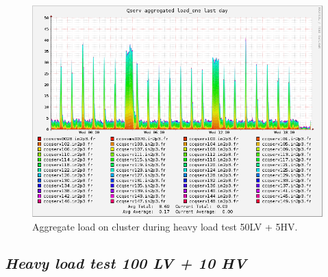 \documentclass[DM,toc]{lsstdoc}
\begin{document}
\begin{figure}
\includegraphics[width=\textwidth]{in2p3_5HV50LV}
\caption{Aggregate load on cluster during heavy load test 50LV + 5HV.}
\label{fig:aggload5}
\end{figure}

\subsection{\texorpdfstring{\textbf{\emph{Heavy load test 100 LV + 10
HV}}}{Heavy load test 100 LV + 10 HV}}\label{heavy-load-test-100-lv-10-hv}
\end{document}
